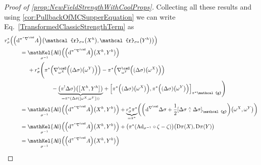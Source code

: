\documentclass[reqno,a4paper,oneside]{amsart}
\theoremstyle{plain}
\theoremstyle{remark}
\theoremstyle{definition}
\DeclareMathOperator{\sAd}{\mathKel{A\mkern-5.5mu d}}
\begin{document}
\begin{proof}[Proof of \ref{prop:NewFieldStrengthWithCoolProps}]
Collecting all these results and using \ref{cor:PullbackOfMCSupperEquation} we can write Eq.\ \eqref{TransformedClassicStrengthTerm} as
\begin{align*}
&
r_\sigma^*\mleft(
\mleft(\mathrm{d}^{\pi^*\nabla^\caG} A\mright) \mleft(\mathcal{r}_{\sigma*}\mleft(X^h\mright), \mathcal{r}_{\sigma*}\mleft(Y^h\mright)\mright)
\mright)
\\&\hspace{1cm}
=
\sAd_{\sigma^{-1}}\mleft(\mleft( \mathrm{d}^{\pi^*\nabla^\caG}A \mright)\mleft( X^h, Y^h \mright) \mright)
\\&\hspace{1.5cm}
	+ r_{\sigma}^*\Biggl(
		\pi^*\mleft(
	\nabla^\caG_{\omega^X}\Bigl( \mleft(\Delta \sigma \mright) \mleft(\omega^Y\mright)\Bigr)
\mright)
		- \pi^*\mleft(
	\nabla^\caG_{\omega^Y}\Bigl( \mleft(\Delta \sigma \mright) \mleft(\omega^X\mright)\Bigr)
\mright)
\\&\hspace{3cm}
		- {\underbrace{\mleft(\pi^! \Delta \sigma \mright) \mleft(\mleft[ X^h, Y^h\mright]\mright)}_{= \pi^* \mleft(\Delta \sigma \mleft(\mleft[ \omega^X, \omega^Y\mright]\mright)\mright)}}
		+ \mleft[ \pi^*\Bigl( \mleft(\Delta \sigma \mright) \mleft(\omega^X\mright) \Bigr), \pi^*\Bigl( \mleft(\Delta \sigma \mright) \mleft(\omega^Y\mright) \Bigr) \mright]_{\mathcal{\pi^*\mathcal{g}}}
\Biggr)
\\&\hspace{1cm}
=
\sAd_{\sigma^{-1}}\mleft(\mleft( \mathrm{d}^{\pi^*\nabla^\caG}A \mright)\mleft( X^h, Y^h \mright) \mright)
	+ {\underbrace{r_{\sigma}^* \pi^*}_{= \pi^*}}\mleft( 
		\mleft(
			\mathrm{d}^{\nabla^\caG} \Delta\sigma
			+ \frac{1}{2} \mleft[ \Delta\sigma \stackrel{\wedge}{,} \Delta\sigma \mright]_{\mathcal{g}}
		\mright)
	\mleft(\omega^X, \omega^Y\mright) \mright)
\\&\hspace{1cm}
=
\sAd_{\sigma^{-1}}\mleft(\mleft( \mathrm{d}^{\pi^*\nabla^\caG}A \mright)\mleft( X^h, Y^h \mright) \mright)
	+ \bigl( \pi^*
		\mleft( \mathrm{Ad}_{\sigma^{-1}} \circ \zeta 
		- \zeta \mright) \bigr)
	\bigl(\mathrm{D}\pi(X), \mathrm{D}\pi(Y)\bigr)
\\&\hspace{1cm}
=
\sAd_{\sigma^{-1}}\mleft(\mleft( \mathrm{d}^{\pi^*\nabla^\caG}A \mright)\mleft( X^h, Y^h \mright) \mright)

\end{align*}
\end{proof}
\end{document}
